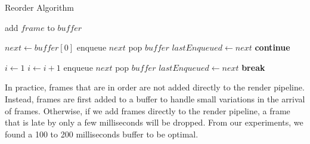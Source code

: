 \begin{algorithm}
    \caption{Reorder Algorithm}\label{alg:reorder}
    \begin{algorithmic}
            \State \Return {}
        \EndIf
        \item[]
        \State add $frame$ to $buffer$
        \item[]
            \State $next \gets buffer[0]$
                \State enqueue $next$
                \State pop $buffer$
                \State $lastEnqueued \gets next$
                \State \textbf{continue}
            \EndIf
            \item[]
            \State $i \gets 1$ 
                \State $i \gets i + 1$
            \EndWhile
             
                \State enqueue $next$
                \State pop $buffer$
                \State $lastEnqueued \gets next$
            \Else {}
                \State \textbf{break} 
            \EndIf
        \EndWhile
    \EndFunction
    \end{algorithmic}
\end{algorithm}

In practice, frames that are in order are not added directly to the render pipeline. Instead, frames are first added to a buffer to handle small variations in the arrival of frames. Otherwise, if we add frames directly to the render pipeline, a frame that is late by only a few milliseconds will be dropped. From our experiments, we found a 100 to 200 milliseconds buffer to be optimal. %

